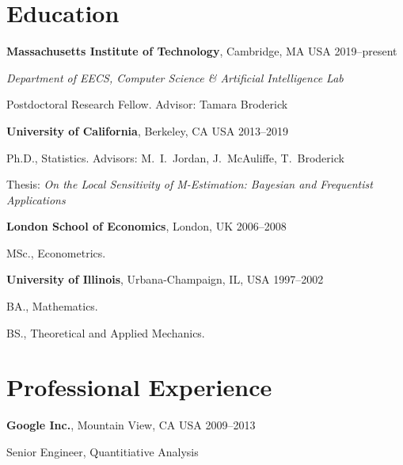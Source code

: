 \documentclass[margin,line]{res}
\newenvironment{list1}{
  \begin{list}{\ding{113}}{%
      \setlength{\itemsep}{0in}
      \setlength{\parsep}{0in} \setlength{\parskip}{0in}
      \setlength{\topsep}{0in} \setlength{\partopsep}{0in}
      \setlength{\leftmargin}{0in}}}{\end{list}} %
\begin{document}
\begin{resume}


\section{\sc Education}

{\bf Massachusetts Institute of Technology}, Cambridge, MA USA
\hfill {2019--present}
\begin{list1}
\item[] {\em Department of EECS, Computer Science \& Artificial Intelligence Lab}
\item[] {Postdoctoral Research Fellow.} Advisor: Tamara Broderick
\end{list1}


{\bf University of California}, Berkeley, CA USA
\hfill {2013--2019}
\begin{list1}
\item[] Ph.D., Statistics. Advisors: M.~I.~Jordan, J.~McAuliffe, T.~Broderick
\item[] Thesis: {\em On the Local Sensitivity of M-Estimation: Bayesian and Frequentist Applications}
\end{list1}


{\bf London School of Economics}, London, UK
\hfill {2006--2008}
\begin{list1}
\item[] MSc., Econometrics.
\end{list1}

{\bf University of Illinois}, Urbana-Champaign, IL, USA
\hfill {1997--2002}
\begin{list1}
\item[] BA., Mathematics.
\item[] BS., Theoretical and Applied Mechanics.
\end{list1}


\section{\sc Professional Experience}

{\bf Google Inc.}, Mountain View, CA USA
\hfill {2009--2013}
\begin{list1}
\item[] Senior Engineer, Quantitiative Analysis
\end{list1}


\end{resume}
\end{document}
